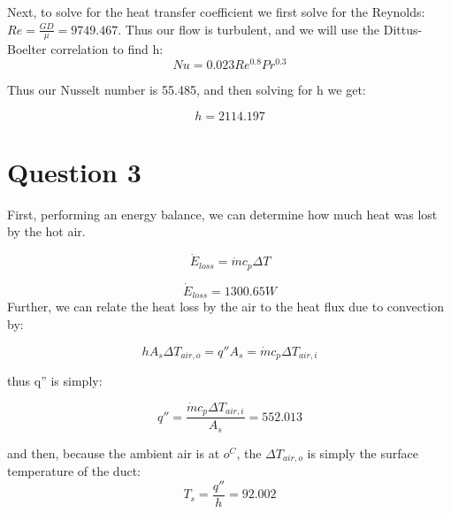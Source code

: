 \documentclass{article}
\begin{document}
Next, to solve for the heat transfer coefficient we first solve for the Reynolds: $Re = \frac{GD}{\mu} = 9749.467$. Thus our flow is turbulent, and we will use the Dittus-Boelter correlation to find h:
\begin{equation}
    Nu = 0.023Re^{0.8}Pr^{0.3}
\end{equation}

Thus our Nusselt number is 55.485, and then solving for h we get:

\begin{equation}
    \boxed{h = 2114.197}
\end{equation}

\section{Question 3}

First, performing an energy balance, we can determine how much heat was lost by the hot air. 

\begin{equation}
    \Dot{E}_{loss} = \Dot{m}c_p\Delta T 
\end{equation}

\begin{equation}
    \boxed{\Dot{E}_{loss} = 1300.65 W}
\end{equation}
Further, we can relate the heat loss by the air to the heat flux due to convection by:

\begin{equation}
    hA_s\Delta T_{air,o} = q''A_s= \Dot{m}c_p\Delta T_{air,i}
\end{equation}

thus q'' is simply:

\begin{equation}
    \boxed{q'' = \frac{\Dot{m}c_p\Delta T_{air,i}}{A_s} = 552.013}
\end{equation}

and then, because the ambient air is at $o^C$, the $\Delta T_{air,o}$ is simply the surface temperature of the duct:
\begin{equation}
    \boxed{T_s = \frac{q''}{h} = 92.002}
\end{equation}
\end{document}

